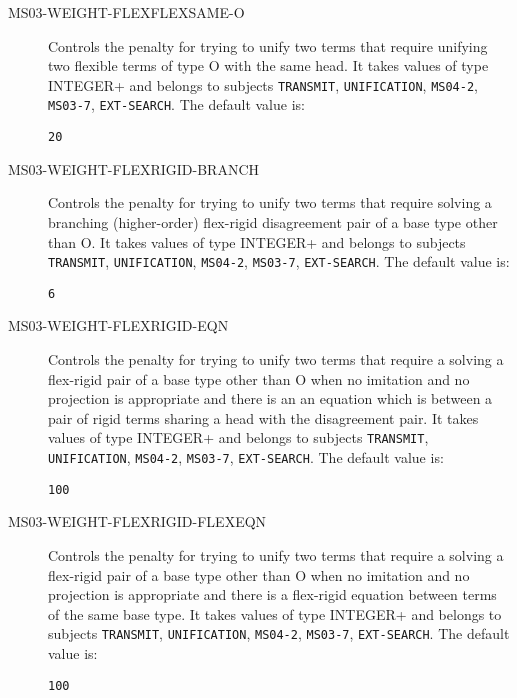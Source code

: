 \begin{description}
\item[MS03-WEIGHT-FLEXFLEXSAME-O]  
Controls the penalty for trying to unify two terms that require
unifying two flexible terms of type O with the same head.
It takes values of type INTEGER+ and belongs to subjects \texttt{TRANSMIT}, \texttt{UNIFICATION}, \texttt{MS04-2}, \texttt{MS03-7}, \texttt{EXT-SEARCH}.  The default value is: \begin{lstlisting}
20
\end{lstlisting}

\item[MS03-WEIGHT-FLEXRIGID-BRANCH]  
Controls the penalty for trying to unify two terms that require
solving a branching (higher-order) flex-rigid disagreement pair of a
base type other than O.
It takes values of type INTEGER+ and belongs to subjects \texttt{TRANSMIT}, \texttt{UNIFICATION}, \texttt{MS04-2}, \texttt{MS03-7}, \texttt{EXT-SEARCH}.  The default value is: \begin{lstlisting}
6
\end{lstlisting}

\item[MS03-WEIGHT-FLEXRIGID-EQN]  
Controls the penalty for trying to unify two terms that require a
solving a flex-rigid pair of a base type other than O when no
imitation and no projection is appropriate and there is an an equation
which is between a pair of rigid terms sharing a head with the
disagreement pair.
It takes values of type INTEGER+ and belongs to subjects \texttt{TRANSMIT}, \texttt{UNIFICATION}, \texttt{MS04-2}, \texttt{MS03-7}, \texttt{EXT-SEARCH}.  The default value is: \begin{lstlisting}
100
\end{lstlisting}

\item[MS03-WEIGHT-FLEXRIGID-FLEXEQN]  
Controls the penalty for trying to unify two terms that require a
solving a flex-rigid pair of a base type other than O when no
imitation and no projection is appropriate and there is a flex-rigid
equation between terms of the same base type.
It takes values of type INTEGER+ and belongs to subjects \texttt{TRANSMIT}, \texttt{UNIFICATION}, \texttt{MS04-2}, \texttt{MS03-7}, \texttt{EXT-SEARCH}.  The default value is: \begin{lstlisting}
100
\end{lstlisting}


\end{description}
